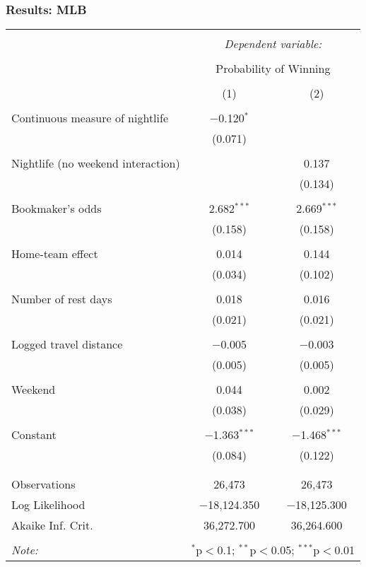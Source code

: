 \documentclass{beamer}
\begin{document}
\begin{frame}   \frametitle{Results: MLB}
  \centering
  \tiny{ %
\begin{tabular}{@{\extracolsep{5pt}}lcc}  \\[-1.8ex]\hline  \hline \\[-1.8ex]   & \multicolumn{2}{c}{\textit{Dependent variable:}} \\  \cline{2-3}  \\[-1.8ex] & \multicolumn{2}{c}{Probability of Winning} \\  \\[-1.8ex] & (1) & (2)\\  \hline \\[-1.8ex]   Continuous measure of nightlife & $-$0.120$^{*}$ &  \\    & (0.071) &  \\    & & \\   Nightlife (no weekend interaction) &  & 0.137 \\    &  & (0.134) \\    & & \\   Bookmaker's odds & 2.682$^{***}$ & 2.669$^{***}$ \\    & (0.158) & (0.158) \\    & & \\   Home-team effect & 0.014 & 0.144 \\    & (0.034) & (0.102) \\    & & \\   Number of rest days & 0.018 & 0.016 \\    & (0.021) & (0.021) \\    & & \\   Logged travel distance & $-$0.005 & $-$0.003 \\    & (0.005) & (0.005) \\    & & \\   Weekend & 0.044 & 0.002 \\    & (0.038) & (0.029) \\    & & \\   Constant & $-$1.363$^{***}$ & $-$1.468$^{***}$ \\    & (0.084) & (0.122) \\    & & \\  \hline \\[-1.8ex]  Observations & 26,473 & 26,473 \\  Log Likelihood & $-$18,124.350 & $-$18,125.300 \\  Akaike Inf. Crit. & 36,272.700 & 36,264.600 \\  \hline  \hline \\[-1.8ex]  \textit{Note:}  & \multicolumn{2}{r}{$^{*}$p$<$0.1; $^{**}$p$<$0.05; $^{***}$p$<$0.01} \\  \end{tabular}  }
\end{frame}
\end{document}
